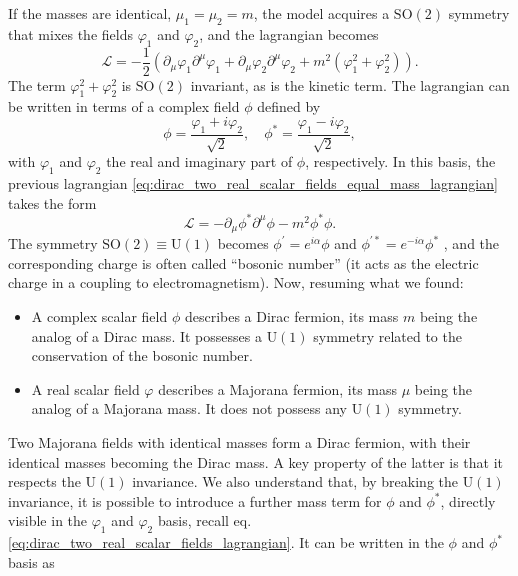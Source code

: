 If the masses are identical, \(\mu_1 = \mu_2 = m\), the model acquires a \(\mathrm{SO}(2)\) symmetry that mixes the fields \(\varphi_1\) and \(\varphi_2\), and the lagrangian becomes
\begin{equation}
    \mathcal{L} = -\frac{1}{2} \left(\partial_\mu \varphi_1 \partial^\mu \varphi_1 + \partial_\mu \varphi_2 \partial^\mu \varphi_2 + m^2 (\varphi_1^2 + \varphi_2^2) \right).
    \label{eq:dirac_two_real_scalar_fields_equal_mass_lagrangian}
\end{equation}
The term \(\varphi_1^2 + \varphi_2^2 \) is \(\mathrm{SO}(2)\) invariant, as is the kinetic term. The lagrangian can be written in terms of a complex field \(\phi\) defined by
\begin{equation}
    \phi = \frac{\varphi_1 + i \varphi_2}{\sqrt{2}}, \quad \phi^* = \frac{\varphi_1 - i \varphi_2}{\sqrt{2}},
    \label{eq:dirac_complex_scalar_field_definition}
\end{equation}
with \(\varphi_1\) and \(\varphi_2\) the real and imaginary part of \(\phi\), respectively. In this basis, the previous lagrangian \eqref{eq:dirac_two_real_scalar_fields_equal_mass_lagrangian} takes the form
\begin{equation}
    \mathcal{L} = - \partial_\mu \phi^* \partial^\mu \phi - m^2 \phi^* \phi.
    \label{eq:dirac_complex_scalar_field_lagrangian}
\end{equation}
The symmetry \(\mathrm{SO}(2) \equiv \mathrm{U}(1)\) becomes \(\phi^{\prime} = e^{i \alpha} \phi\) and \(\phi^{\prime *} = e^{-i \alpha} \phi^*\) , and the corresponding charge is often called “bosonic number” (it acts as the electric charge in a coupling to electromagnetism).
Now, resuming what we found:
\begin{itemize}
    \item[(i)] A complex scalar field \(\phi\) describes a Dirac fermion, its mass \(m\) being the analog of a Dirac mass. It possesses a \(\mathrm{U}(1)\) symmetry related to the conservation of the bosonic number.
    \item[(ii)] A real scalar field \(\varphi\) describes a Majorana fermion, its mass \(\mu\) being the analog of a Majorana mass. It does not possess any \(\mathrm{U}(1)\) symmetry.
\end{itemize}
Two Majorana fields with identical masses form a Dirac fermion, with their identical masses becoming the Dirac mass. A key property of the latter is that it respects the \(\mathrm{U}(1)\) invariance. We also understand that, by breaking the \(\mathrm{U}(1)\) invariance, it is possible to introduce a further mass term for \(\phi\) and \(\phi^*\), directly visible in the \(\varphi_1\) and \(\varphi_2\) basis, recall eq. \eqref{eq:dirac_two_real_scalar_fields_lagrangian}. It can be written in the \(\phi\) and \(\phi^*\) basis as
